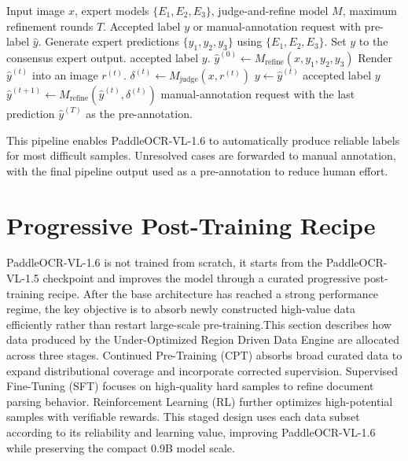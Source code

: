 \documentclass[11pt, a4paper,logo,  copyright, nonumbering]{paddleocr}
\begin{document}
\begin{algorithm}[H]
\caption{Multi-Expert Consensus and Render-Guided Label Refinement}
\label{alg:judge_refine_annotation}
\begin{algorithmic}[1]
\REQUIRE Input image $x$, expert models $\{E_1,E_2,E_3\}$, judge-and-refine model $M$, maximum refinement rounds $T$.
\ENSURE Accepted label $y$ or manual-annotation request with pre-label $\hat{y}$.
\STATE Generate expert predictions $\{y_1,y_2,y_3\}$ using $\{E_1,E_2,E_3\}$.
    \STATE Set $y$ to the consensus expert output.
    \RETURN accepted label $y$.
\ENDIF
\STATE $\hat{y}^{(0)} \leftarrow M_{\mathrm{refine}}(x, y_1, y_2, y_3)$ 
    \STATE Render $\hat{y}^{(t)}$ into an image $r^{(t)}$.
    \STATE $\delta^{(t)} \leftarrow M_{\mathrm{judge}}(x, r^{(t)})$ 
        \STATE $y \leftarrow \hat{y}^{(t)}$
        \RETURN accepted label $y$
    \ENDIF
    \STATE $\hat{y}^{(t+1)} \leftarrow M_{\mathrm{refine}}(\hat{y}^{(t)}, \delta^{(t)})$ 
\ENDFOR
\RETURN manual-annotation request with the last prediction $\hat{y}^{(T)}$ as the pre-annotation.
\end{algorithmic}
\end{algorithm}

This pipeline enables PaddleOCR-VL-1.6 to automatically produce reliable labels for most difficult samples. Unresolved cases are forwarded to manual annotation, with the final pipeline output used as a pre-annotation to reduce human effort.

\section{Progressive Post-Training Recipe}

PaddleOCR-VL-1.6 is not trained from scratch, it starts from the PaddleOCR-VL-1.5 checkpoint and improves the model through a curated progressive post-training recipe. After the base architecture has reached a strong performance regime, the key objective is to absorb newly constructed high-value data efficiently rather than restart large-scale pre-training.This section describes how data produced by the Under-Optimized Region Driven Data Engine are allocated across three stages. Continued Pre-Training (CPT) absorbs broad curated data to expand distributional coverage and incorporate corrected supervision. Supervised Fine-Tuning (SFT) focuses on high-quality hard samples to refine document parsing behavior. Reinforcement Learning (RL) further optimizes high-potential samples with verifiable rewards. This staged design uses each data subset according to its reliability and learning value, improving PaddleOCR-VL-1.6 while preserving the compact 0.9B model scale.
\end{document}
